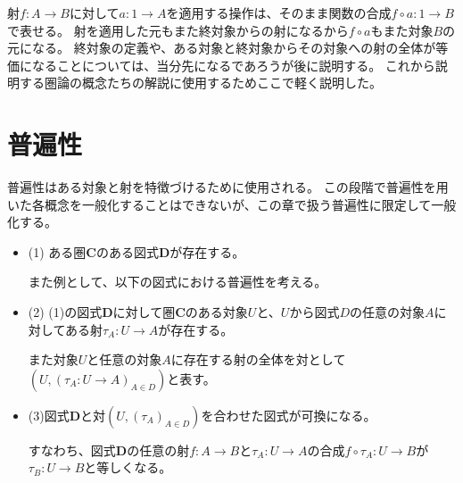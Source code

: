 \documentclass[dvipdfmx]{jsarticle}
\newcommand{\cat}[1]{\boldsymbol{#1}}
\newcommand{\arrow}{\rightarrow}
\newcommand{\mor}[3]{#1:#2\arrow #3}
\begin{document}
	射$\mor{f}{A}{B}$に対して$\mor{a}{1}{A}$を適用する操作は、そのまま関数の合成$\mor{f\circ a}{1}{B}$で表せる。
	射を適用した元もまた終対象からの射になるから$f\circ a$もまた対象$B$の元になる。
	終対象の定義や、ある対象と終対象からその対象への射の全体が等価になることについては、当分先になるであろうが後に説明する。
	これから説明する圏論の概念たちの解説に使用するためここで軽く説明した。

	\section{普遍性}
	普遍性はある対象と射を特徴づけるために使用される。
	この段階で普遍性を用いた各概念を一般化することはできないが、この章で扱う普遍性に限定して一般化する。
	\begin{itemize}
		\item (1) ある圏$\cat{C}$のある図式$\cat{D}$が存在する。

		また例として、以下の図式における普遍性を考える。
		\begin{center}
		\end{center}
		\item (2) (1)の図式$\cat{D}$に対して圏$\cat{C}$のある対象$U$と、$U$から図式$D$の任意の対象$A$に対してある射$\mor{\tau_A}{U}{A}$が存在する。

		また対象$U$と任意の対象$A$に存在する射の全体を対として$(U,(\mor{\tau_A}{U}{A})_{A\in D})$と表す。
		\begin{center}
		\end{center}
		\item (3)図式$\cat{D}$と対$(U,(\tau_A)_{A\in D})$を合わせた図式が可換になる。

		すなわち、図式$\cat{D}$の任意の射$\mor{f}{A}{B}$と$\mor{\tau_A}{U}{A}$の合成$\mor{f\circ\tau_A}{U}{B}$が$\mor{\tau_B}{U}{B}$と等しくなる。


\end{itemize}
\end{document}

